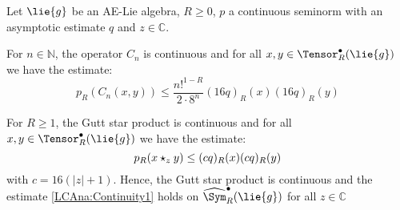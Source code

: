 \begin{theorem}
    \label{Thm:LCAna:Continuity1}%
    Let $\lie{g}$ be an AE-Lie algebra, $R \geq 0$, $p$ a continuous seminorm
    with an asymptotic estimate $q$ and $z \in \mathbb{C}$.
    \begin{theoremlist}
    	\item \label{item:CnOperatorEstimate}
    	For $n \in \mathbb{N}$, the operator $C_n$ is continuous and for all
    	$x, y \in \Tensor_R^{\bullet}(\lie{g})$ we have the estimate:
    	\begin{equation}
    		\label{LCAna:CnOperators}
    		p_R \left( C_n(x,y) \right)
			\leq
        	\frac{n!^{1 - R}}{2 \cdot 8^n}
        	(16 q)_R (x)
        	(16 q)_R (y)
    	\end{equation}
    	\item \label{item:LCAna:Continuity1}
    	For $R \geq 1$, the Gutt star product is continuous and for all
    	$x, y \in \Tensor_R^{\bullet}(\lie{g})$ we have the estimate:
	    \begin{equation}
	   	    \label{LCAna:Continuity1}
	        p_R(x \star_z y)
	        \leq
	        (c q)_R(x) (c q)_R(y)
	    \end{equation}
	    with $c = 16(|z| + 1)$. Hence, the Gutt star product is continuous and
	    the estimate \eqref{LCAna:Continuity1} holds on
	    $\widehat{\Sym}_R^\bullet(\lie{g})$ for all $z \in \mathbb{C}$
	\end{theoremlist}
\end{theorem}
